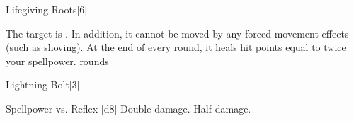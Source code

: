 \begin{spellsection}{Lifegiving Roots}[6]
    \begin{spellheader}
    \end{spellheader}
    \begin{spellcontent}
        \begin{spelltargetinginfo}
        \end{spelltargetinginfo}
        \begin{spelleffects}
            \spellsuccess The target is \immobilized. In addition, it cannot be moved by any forced movement effects (such as shoving). At the end of every round, it heals hit points equal to twice your spellpower.
             rounds
        \end{spelleffects}
    \end{spellcontent}
    \begin{spellfooter}
        \miscastexplode
    \end{spellfooter}
\end{spellsection}

\begin{spellsection}{Lightning Bolt}[3]
    \begin{spellheader}
    \end{spellheader}
    \begin{spellcontent}
        \begin{spelltargetinginfo}
        \end{spelltargetinginfo}
        \begin{spelleffects}
            \begin{spellattack}{Spellpower vs. Reflex}
                \spellsuccess {}[d8]
                \spellcritical Double damage.
                \spellfailure Half damage.
            \end{spellattack}
        \end{spelleffects}
    \end{spellcontent}
    \begin{spellfooter}
        \miscastexplode
    \end{spellfooter}
    \begin{spellaugments}
    \end{spellaugments}
\end{spellsection}

